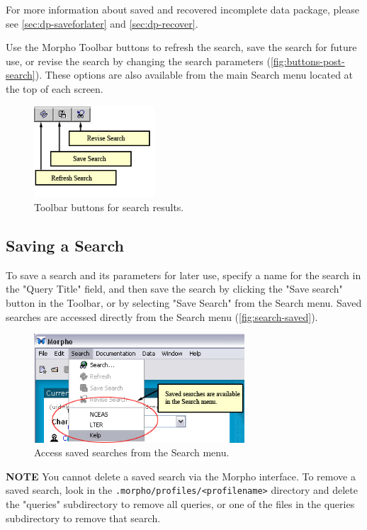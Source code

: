 For more information about saved and recovered incomplete data package,
please see \autoref{sec:dp-saveforlater} and
\autoref{sec:dp-recover}.

Use the Morpho Toolbar buttons to refresh the search, save the search
for future use, or revise the search by changing the search parameters
(\autoref{fig:buttons-post-search}). These options are also available
from the main Search menu located at the top of each screen.

\begin{figure}
  \centering
    \includegraphics[width=0.4\textwidth]{images/buttons-post-search.jpg}
  \caption{Toolbar buttons for search results.}
  \label{fig:buttons-post-search}
\end{figure}

\subsection{Saving a Search}

To save a search and its parameters for later use, specify a name for
the search in the "Query Title" field, and then save the search by
clicking the "Save search" button in the Toolbar, or by selecting "Save
Search" from the Search menu. Saved searches are accessed directly from
the Search menu (\autoref{fig:search-saved}).

\begin{figure}
  \centering
    \includegraphics[width=0.7\textwidth]{images/search-saved.jpg}
  \caption{Access saved searches from the Search menu.}
  \label{fig:search-saved}
\end{figure}

\begin{shaded}
  \textbf{NOTE} You cannot delete a saved search via the Morpho
  interface. To remove a saved search, look in the
  \texttt{.morpho/profiles/<profilename>} directory and delete the
  "queries" subdirectory to remove all queries, or one of the files in
  the queries subdirectory to remove that search.
\end{shaded}

